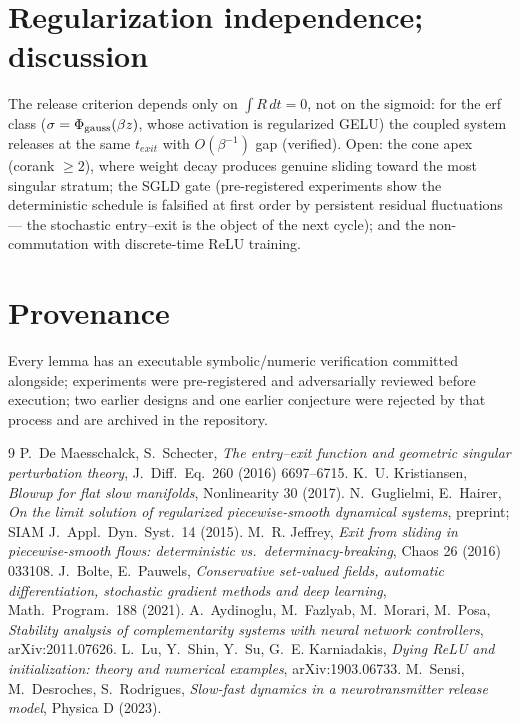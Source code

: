 \documentclass[11pt]{article}
\begin{document}
\section{Regularization independence; discussion}\label{sec:reg}
The release criterion depends only on $\int R\,dt=0$, not on the sigmoid: for
the erf class ($\sigma=\Phi_{\rm gauss}(\beta z)$, whose activation is
regularized GELU) the coupled system releases at the same $t_{exit}$ with
$O(\beta^{-1})$ gap (verified). Open: the cone apex (corank $\ge2$), where
weight decay produces genuine sliding toward the most singular stratum; the
SGLD gate (pre-registered experiments show the deterministic schedule is
falsified at first order by persistent residual fluctuations --- the stochastic
entry--exit is the object of the next cycle); and the non-commutation with
discrete-time ReLU training.

\section*{Provenance}
Every lemma has an executable symbolic/numeric verification committed alongside;
experiments were pre-registered and adversarially reviewed before execution;
two earlier designs and one earlier conjecture were rejected by that process
and are archived in the repository.

\begin{thebibliography}{9}
 P.~De Maesschalck, S.~Schecter, \emph{The entry--exit function
and geometric singular perturbation theory}, J.~Diff.~Eq.\ 260 (2016) 6697--6715.
 K.~U. Kristiansen, \emph{Blowup for flat slow manifolds},
Nonlinearity 30 (2017).
 N.~Guglielmi, E.~Hairer, \emph{On the limit solution of regularized
piecewise-smooth dynamical systems}, preprint; SIAM J.~Appl.~Dyn.~Syst.\ 14 (2015).
 M.~R. Jeffrey, \emph{Exit from sliding in piecewise-smooth
flows: deterministic vs.\ determinacy-breaking}, Chaos 26 (2016) 033108.
 J.~Bolte, E.~Pauwels, \emph{Conservative set-valued fields,
automatic differentiation, stochastic gradient methods and deep learning},
Math.~Program.\ 188 (2021).
 A.~Aydinoglu, M.~Fazlyab, M.~Morari, M.~Posa, \emph{Stability
analysis of complementarity systems with neural network controllers},
arXiv:2011.07626.
 L.~Lu, Y.~Shin, Y.~Su, G.~E. Karniadakis, \emph{Dying ReLU and
initialization: theory and numerical examples}, arXiv:1903.06733.
 M.~Sensi, M.~Desroches, S.~Rodrigues, \emph{Slow-fast dynamics
in a neurotransmitter release model}, Physica D (2023).
\end{thebibliography}
\end{document}
